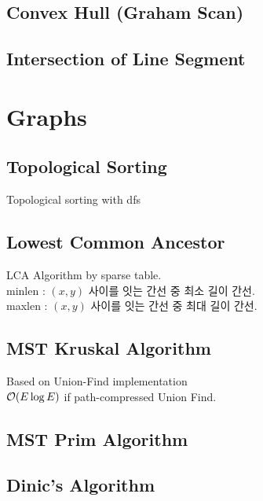 \documentclass[landscape,8pt]{article}
\begin{document}
\begin{multicols}{2}
  \subsection{Convex Hull (Graham Scan)}
    

  \subsection{Intersection of Line Segment}
    

\section{Graphs}
  \subsection{Topological Sorting}
  Topological sorting with dfs
    

  \subsection{Lowest Common Ancestor}
  LCA Algorithm by sparse table.\\
  minlen : $(x, y)$ 사이를 잇는 간선 중 최소 길이 간선.\\
  maxlen : $(x, y)$ 사이를 잇는 간선 중 최대 길이 간선.
    

  \subsection{MST Kruskal Algorithm}
  Based on Union-Find implementation\\
  $\order{E \log E}$ if path-compressed Union Find.
    

  \subsection{MST Prim Algorithm}
    

  \subsection{Dinic's Algorithm}
    


\end{multicols}
\end{document}
